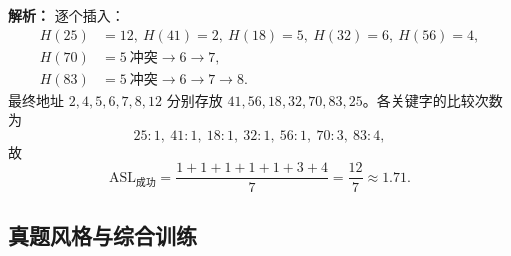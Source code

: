 \begin{enumerate}
\ifshowsolutions\par\noindent\textbf{解析：} 逐个插入：
\[
\begin{aligned}
H(25)&=12,\ H(41)=2,\ H(18)=5,\ H(32)=6,\ H(56)=4,\\
H(70)&=5\ \text{冲突}\to6\to7,\\
H(83)&=5\ \text{冲突}\to6\to7\to8.
\end{aligned}
\]
最终地址 $2,4,5,6,7,8,12$ 分别存放 $41,56,18,32,70,83,25$。各关键字的比较次数为
\[
25:1,\ 41:1,\ 18:1,\ 32:1,\ 56:1,\ 70:3,\ 83:4,
\]
故
\[
\mathrm{ASL}_{\text{成功}}=\frac{1+1+1+1+1+3+4}{7}=\frac{12}{7}\approx1.71.
\]
\par\noindent{}\else \answerarea \fi

\end{enumerate}

\subsection{真题风格与综合训练}

